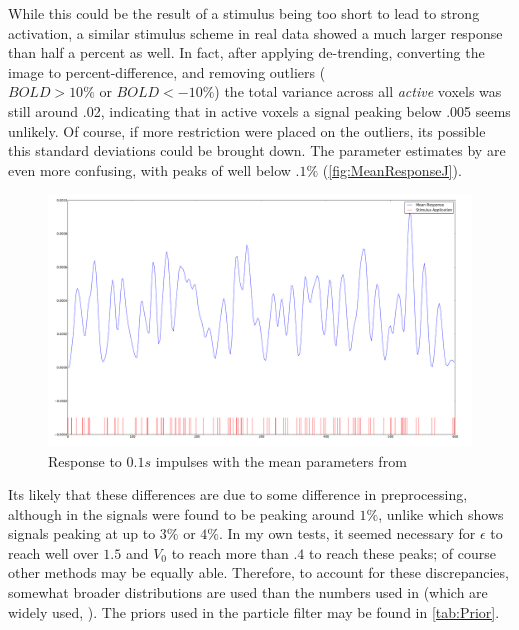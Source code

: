 While this could be the result of a stimulus
being too short to lead to strong activation, a similar stimulus
scheme in real data showed a much larger response than 
half a percent as well. In fact, after applying de-trending,
converting the image to percent-difference, and removing 
outliers ($ BOLD > 10\% \text{ or } BOLD < -10\%$) the total variance
across all \emph{active} voxels was still around .02, indicating
that in active voxels a signal peaking below .005 seems unlikely. 
Of course, if more restriction were placed on the outliers, its possible
this standard deviations could be brought down. 
The parameter estimates by \cite{Johnston2008} are even more 
confusing, with peaks of well below $.1\%$ (\autoref{fig:MeanResponseJ}).

\begin{figure}
\centering
\label{fig:MeanResponseJ}
\includegraphics[trim=6cm 3cm 6cm 3cm,width=16cm]{images/mean_response_johnston}
\caption{Response to $0.1s$ impulses with the mean parameters from \cite{Johnston2008}}
\end{figure}

Its likely that these differences are due to some difference in preprocessing,
although in \cite{Deneux2006} the signals were found to be peaking around
$1\%$, unlike \cite{Friston2000} which shows signals peaking at up to
$3\%$ or $4\%$. In my own tests, it seemed necessary for $\epsilon$ to
reach well over $1.5$ and $V_0$ to reach more than $.4$ to reach these
peaks; of course other methods may be equally able. 
Therefore, to account for these discrepancies, somewhat broader
distributions are used than the numbers used in \cite{Friston2000}
(which are widely used, \cite{Hu2009}). The 
priors used in the particle filter may be found in \autoref{tab:Prior}.

